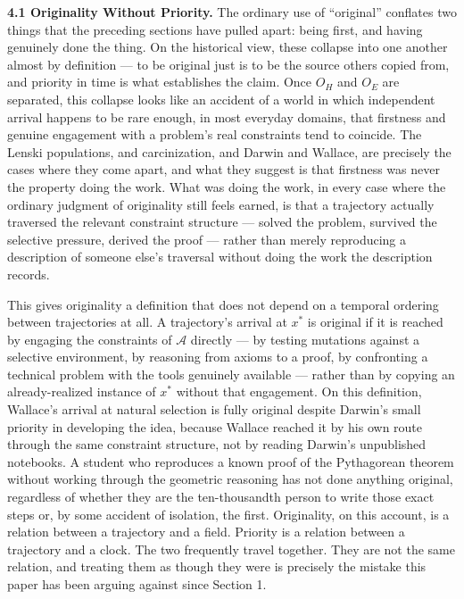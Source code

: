 \documentclass[11pt]{article}
\theoremstyle{plain}
\begin{document}
\textbf{4.1 Originality Without Priority.} The ordinary use of ``original'' conflates two things that the preceding sections have pulled apart: being first, and having genuinely done the thing. On the historical view, these collapse into one another almost by definition --- to be original just is to be the source others copied from, and priority in time is what establishes the claim. Once \(O_H\) and \(O_E\) are separated, this collapse looks like an accident of a world in which independent arrival happens to be rare enough, in most everyday domains, that firstness and genuine engagement with a problem's real constraints tend to coincide. The Lenski populations, and carcinization, and Darwin and Wallace, are precisely the cases where they come apart, and what they suggest is that firstness was never the property doing the work. What was doing the work, in every case where the ordinary judgment of originality still feels earned, is that a trajectory actually traversed the relevant constraint structure --- solved the problem, survived the selective pressure, derived the proof --- rather than merely reproducing a description of someone else's traversal without doing the work the description records.

This gives originality a definition that does not depend on a temporal ordering between trajectories at all. A trajectory's arrival at \(x^\ast\) is original if it is reached by engaging the constraints of \(\mathcal{A}\) directly --- by testing mutations against a selective environment, by reasoning from axioms to a proof, by confronting a technical problem with the tools genuinely available --- rather than by copying an already-realized instance of \(x^\ast\) without that engagement. On this definition, Wallace's arrival at natural selection is fully original despite Darwin's small priority in developing the idea, because Wallace reached it by his own route through the same constraint structure, not by reading Darwin's unpublished notebooks. A student who reproduces a known proof of the Pythagorean theorem without working through the geometric reasoning has not done anything original, regardless of whether they are the ten-thousandth person to write those exact steps or, by some accident of isolation, the first. Originality, on this account, is a relation between a trajectory and a field. Priority is a relation between a trajectory and a clock. The two frequently travel together. They are not the same relation, and treating them as though they were is precisely the mistake this paper has been arguing against since Section 1.
\end{document}
